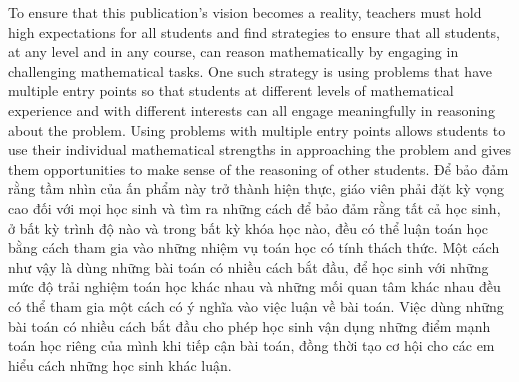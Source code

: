 \documentclass[
  10pt,
  a4paper,
  landscape,
  twoside,
  openany
]{scrbook}
\newcommand{\EN}[1]{#1}
\newcommand{\VI}[1]{#1}
\newcommand{\NOTE}[1]{#1}
\begin{document}
\TriPara
{
\EN{To ensure that this publication's vision becomes a reality, teachers must hold high expectations for all students and find strategies to ensure that all students, at any level and in any course, can reason mathematically by engaging in challenging mathematical tasks. One such strategy is using problems that have multiple entry points so that students at different levels of mathematical experience and with different interests can all engage meaningfully in reasoning about the problem. Using problems with multiple entry points allows students to use their individual mathematical strengths in approaching the problem and gives them opportunities to make sense of the reasoning of other students.}
}
{
\VI{Để bảo đảm rằng tầm nhìn của ấn phẩm này trở thành hiện thực, giáo viên phải đặt kỳ vọng cao đối với mọi học sinh và tìm ra những cách để bảo đảm rằng tất cả học sinh, ở bất kỳ trình độ nào và trong bất kỳ khóa học nào, đều có thể luận toán học bằng cách tham gia vào những nhiệm vụ toán học có tính thách thức. Một cách như vậy là dùng những bài toán có nhiều cách bắt đầu, để học sinh với những mức độ trải nghiệm toán học khác nhau và những mối quan tâm khác nhau đều có thể tham gia một cách có ý nghĩa vào việc luận về bài toán. Việc dùng những bài toán có nhiều cách bắt đầu cho phép học sinh vận dụng những điểm mạnh toán học riêng của mình khi tiếp cận bài toán, đồng thời tạo cơ hội cho các em hiểu cách những học sinh khác luận.}
}
{
\NOTE{}
}
\end{document}

